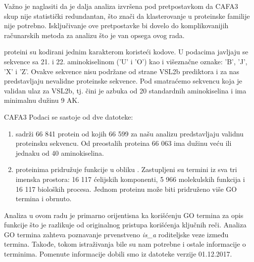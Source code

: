 Važno je naglasiti da je dalja analiza izvršena pod pretpostavkom da CAFA3 skup
nije statistički redundantan, što znači da klasterovanje u proteinske familije
nije potrebno.  Isključivanje ove pretpostavke bi dovelo do komplikovanijih
računarskih metoda za analizu što je van opsega ovog rada.




\swissprot proteini su kodirani jednim karakterom koristeći 
kodove.  U podacima javljaju se sekvence sa  21. i 22. aminokiselinom ('U' i 'O')
kao i  višeznačne oznake: 'B', 'J', 'X' i 'Z'.  Ovakve sekvence nisu podržane od
strane VSL2b prediktora i za nas predstavljaju nevalidne proteinske sekvence. Pod
 smatraćemo sekvencu koja je validan
ulaz za VSL2b, tj. čini je azbuka od 20 standardnih aminokiselina i
ima minimalnu dužinu 9 AK.

CAFA3 Podaci se sastoje od dve datoteke:
\begin{enumerate}
  \item {}  sadrži 66 841 protein od kojih 66 599
    za našu analizu predstavljaju validnu proteinsku sekvencu. Od preostalih
    proteina 66 063 ima dužinu veću ili jednaku od 40 aminokiselina.
  \item {} proteinima pridružuje funkcije u obliku 
    . Zastupljeni su termini iz sva tri imenska prostora:
    16 117 ćelijskih komponenti, 5 966 molekulskih funkcija i 16 117 bioloških
    procesa. Jednom proteinu može biti pridruženo više GO termina i obrnuto.
\end{enumerate}

Analiza u ovom radu je primarno orijentisna ka korišćenju GO termina za opis
funkcije što je razlikuje od originalnog pristupa korišćenja ključnih reči.
Analiza GO termina zahteva poznavanje prvenstveno \textit{is\_a} roditeljske
veze između termina. Takođe, tokom istraživanja bile su nam potrebne i ostale
informacije o terminima. Pomenute informacije dobili smo iz datoteke
 \cite{go_obo} verzije 01.12.2017.


